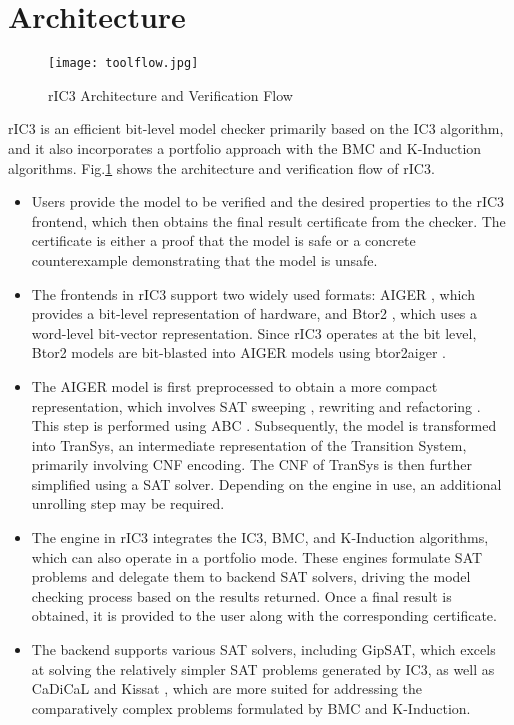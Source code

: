 \documentclass[runningheads]{llncs}
\begin{document}
\section{Architecture}
\begin{figure}[!t]
    \centering
    \texttt{[image: toolflow.jpg]}
    \caption{rIC3 Architecture and Verification Flow}
    \label{fig:Flow}
\end{figure}
rIC3 is an efficient bit-level model checker primarily based on the IC3 algorithm, and it also incorporates a portfolio approach with the BMC and K-Induction algorithms. Fig.\ref{fig:Flow} shows the architecture and verification flow of rIC3.

\begin{itemize}
    \item Users provide the model to be verified and the desired properties to the rIC3 frontend, which then obtains the final result certificate from the checker. The certificate is either a proof that the model is safe or a concrete counterexample demonstrating that the model is unsafe.

    \item The frontends in rIC3 support two widely used formats: AIGER \cite{AIGER}, which provides a bit-level representation of hardware, and Btor2 \cite{Btor2}, which uses a word-level bit-vector representation. Since rIC3 operates at the bit level, Btor2 models are bit-blasted into AIGER models using btor2aiger \cite{Btor2AIGER}.

    \item The AIGER model is first preprocessed to obtain a more compact representation, which involves SAT sweeping \cite{SATSweeping}, rewriting \cite{AIGRewrite} and refactoring \cite{AIGFactor}. This step is performed using ABC \cite{ABC}. Subsequently, the model is transformed into TranSys, an intermediate representation of the Transition System, primarily involving CNF encoding. The CNF of TranSys is then further simplified using a SAT solver. Depending on the engine in use, an additional unrolling step may be required.

    \item The engine in rIC3 integrates the IC3, BMC, and K-Induction algorithms, which can also operate in a portfolio mode. These engines formulate SAT problems and delegate them to backend SAT solvers, driving the model checking process based on the results returned. Once a final result is obtained, it is provided to the user along with the corresponding certificate.

    \item The backend supports various SAT solvers, including GipSAT, which excels at solving the relatively simpler SAT problems generated by IC3, as well as CaDiCaL \cite{CaDiCaL} and Kissat \cite{Kissat}, which are more suited for addressing the comparatively complex problems formulated by BMC and K-Induction.

\end{itemize}
\end{document}
